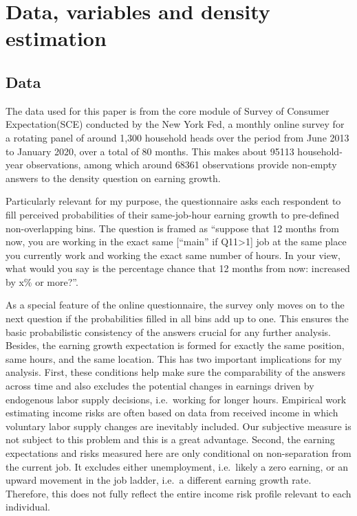 \documentclass[12pt,notitlepage,onecolumn,aps,pra]{article}
\begin{document}
    \hypertarget{data-variables-and-density-estimation}{%
\section{Data, variables and density
estimation}\label{data-variables-and-density-estimation}}

\hypertarget{data}{%
\subsection{Data}\label{data}}

The data used for this paper is from the core module of Survey of
Consumer Expectation(SCE) conducted by the New York Fed, a monthly
online survey for a rotating panel of around 1,300 household heads over
the period from June 2013 to January 2020, over a total of 80 months.
This makes about 95113 household-year observations, among which around
68361 observations provide non-empty answers to the density question on
earning growth.

Particularly relevant for my purpose, the questionnaire asks each
respondent to fill perceived probabilities of their same-job-hour
earning growth to pre-defined non-overlapping bins. The question is
framed as ``suppose that 12 months from now, you are working in the
exact same {[}``main'' if Q11\textgreater1{]} job at the same place you
currently work and working the exact same number of hours. In your view,
what would you say is the percentage chance that 12 months from now:
increased by x\% or more?''.

As a special feature of the online questionnaire, the survey only moves
on to the next question if the probabilities filled in all bins add up
to one. This ensures the basic probabilistic consistency of the answers
crucial for any further analysis. Besides, the earning growth
expectation is formed for exactly the same position, same hours, and the
same location. This has two important implications for my analysis.
First, these conditions help make sure the comparability of the answers
across time and also excludes the potential changes in earnings driven
by endogenous labor supply decisions, i.e.~working for longer hours.
Empirical work estimating income risks are often based on data from
received income in which voluntary labor supply changes are inevitably
included. Our subjective measure is not subject to this problem and this
is a great advantage. Second, the earning expectations and risks
measured here are only conditional on non-separation from the current
job. It excludes either unemployment, i.e.~likely a zero earning, or an
upward movement in the job ladder, i.e.~a different earning growth rate.
Therefore, this does not fully reflect the entire income risk profile
relevant to each individual.
\end{document}
